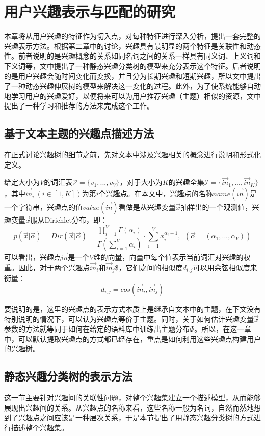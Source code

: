 \section{用户兴趣表示与匹配的研究}
本章将从用户兴趣的特征作为切入点，对每种特征进行深入分析，提出一套完整的兴趣表示方法。根据第二章中的讨论，兴趣具有最明显的两个特征是关联性和动态性。前者说明的是兴趣概念的关系如同名词之间的关系一样具有同义词、上义词和下义词等，文中提出了一种静态兴趣分类树的模型来充分表示这个特征。后者说明的是用户兴趣会随时间变化而变换，并且分为长期兴趣和短期兴趣，所以文中提出了一种动态兴趣伸展树的模型来解决这一变化的过程。此外，为了使系统能够自动地学习用户的兴趣爱好，以便将来可以为用户推荐兴趣（主题）相似的资源，文中提出了一种学习和推荐的方法来完成这个工作。

\subsection{基于文本主题的兴趣点描述方法}
在正式讨论兴趣树的细节之前，先对文本中涉及兴趣相关的概念进行说明和形式化定义。

给定大小为$V$的词汇表$\mathcal{V}=\{v_1,...,v_V\}$，对于大小为$K$的兴趣全集$\mathcal{I}=\{\vec{in}_1,...,\vec{in}_K\}$，其中$\vec{in}_i~(i\in [1,K])$为第$i$个兴趣点。在本文中，兴趣点的名称$name(\vec{in})$是一个字符串，兴趣点的值$value(\vec{in})$看做是从兴趣变量$\vec{x}$抽样出的一个观测值，兴趣变量$\vec{x}$服从Dirichlet分布，即：
\begin{equation*}
  p(\vec{x}|\vec{\alpha})=Dir(\vec{x}|\vec{\alpha})=\frac{\prod_{i=1}^{V}\Gamma(\alpha_i)}{\Gamma(\sum_{i=1}^{V}\alpha_i)}\cdot \sum_{i=1}^{V}x_i^{\alpha_i-1},~~(\vec{\alpha}=(\alpha_1,...,\alpha_V))
\end{equation*}
可以看出，兴趣点$\vec{in}$是一个$V$维的向量，向量中每个值表示当前词汇对兴趣的权重。因此，对于两个兴趣点$\vec{in}_i$和$\vec{in}_j$\$，它们之间的相似度$d_{i,j}$可以用余弦相似度来衡量：
\begin{equation*}
  d_{i,j}=cos(\vec{in}_i,\vec{in}_j)
\end{equation*}

要说明的是，这里的兴趣点的表示方式本质上是继承自文本中的主题，在下文没有特别说明的情况下，可以认为兴趣点等价于主题。同时，关于如何估计兴趣变量$\vec{x}$参数的方法就等同于如何在给定的语料库中训练出主题分布$\Phi$。所以，在这一章中，可以默认提取兴趣点的方式都已经存在，重点是如何利用这些兴趣点构建用户的兴趣树。

\subsection{静态兴趣分类树的表示方法}
这一节主要针对兴趣间的关联性问题，对整个兴趣集建立一个描述模型，从而能够展现出兴趣间的关系。从兴趣点的名称来看，这些名称一般为名词，自然而然地想到了兴趣点之间应该是一种层次关系，于是本节提出了用静态兴趣分类树的方式进行描述整个兴趣集。

